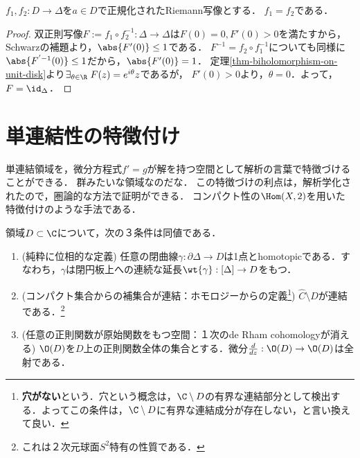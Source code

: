 \documentclass[uplatex, dvipdfmx]{jsreport}
\begin{document}
\begin{lemma}
    $f_1,f_2:D\to\Delta$を$a\in D$で正規化されたRiemann写像とする．
    $f_1=f_2$である．
\end{lemma}
\begin{proof}
    双正則写像$F:=f_1\circ f_2^{-1}:\Delta\to\Delta$は$F(0)=0,F'(0)>0$を満たすから，
    Schwarzの補題より，$\abs{F'(0)}\le 1$である．
    $F^{-1}=f_2\circ f_1^{-1}$についても同様に$\abs{F^{'-1}(0)}\le 1$だから，$\abs{F'(0)}=1$．
    定理\ref{thm-biholomorphism-on-unit-disk}より$\exists_{\theta\in\R}\;F(z)=e^{i\theta}z$であるが，
    $F'(0)>0$より，$\theta=0$．よって，$F=\id_\Delta$．
\end{proof}

\section{単連結性の特徴付け}

\begin{tcolorbox}[colframe=ForestGreen, colback=ForestGreen!10!white,breakable,colbacktitle=ForestGreen!40!white,coltitle=black,fonttitle=\bfseries\sffamily,
title=]
    単連結領域を，微分方程式$f'=g$が解を持つ空間として解析の言葉で特徴づけることができる．
    群みたいな領域なのだな．
    この特徴づけの利点は，解析学化されたので，圏論的な方法で証明ができる．
    コンパクト性の$\Hom(X,2)$を用いた特徴付けのような手法である．
\end{tcolorbox}

\begin{proposition}[単連結性の特徴付け]\label{prop-characterization-of-simply-connectedness}
    領域$D\subset\C$について，次の３条件は同値である．
    \begin{enumerate}
        \item (純粋に位相的な定義) 任意の閉曲線$\gamma:\partial\Delta\to D$は1点とhomotopicである．すなわち，$\gamma$は閉円板上への連続な延長$\wt{\gamma}:[\Delta]\to D$をもつ．
        \item (コンパクト集合からの補集合が連結：ホモロジーからの定義\footnote{\textbf{穴がない}という．穴という概念は，$\C\setminus D$の有界な連結部分として検出する．よってこの条件は，$\C\setminus D$に有界な連結成分が存在しない，と言い換えて良い．}) $\hat{C}\setminus D$が連結である．\footnote{これは２次元球面$S^2$特有の性質である．}
        \item (任意の正則関数が原始関数をもつ空間：１次のde Rham cohomologyが消える) $\O(D)$を$D$上の正則関数全体の集合とする．微分$\frac{d}{dz}:\O(D)\to\O(D)$は全射である．
    \end{enumerate}
\end{proposition}
\end{document}
